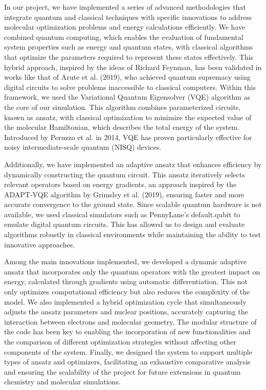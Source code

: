 In our project, we have implemented a series of advanced methodologies that integrate quantum and classical techniques with specific innovations to address molecular optimization problems and energy calculations efficiently. We have combined quantum computing, which enables the evaluation of fundamental system properties such as energy and quantum states, with classical algorithms that optimize the parameters required to represent these states effectively. This hybrid approach, inspired by the ideas of Richard Feynman, has been validated in works like that of Arute et al. (2019), who achieved quantum supremacy using digital circuits to solve problems inaccessible to classical computers. Within this framework, we used the Variational Quantum Eigensolver (VQE) algorithm as the core of our simulation. This algorithm combines parameterized circuits, known as ansatz, with classical optimization to minimize the expected value of the molecular Hamiltonian, which describes the total energy of the system. Introduced by Peruzzo et al. in 2014, VQE has proven particularly effective for noisy intermediate-scale quantum (NISQ) devices.

Additionally, we have implemented an adaptive ansatz that enhances efficiency by dynamically constructing the quantum circuit. This ansatz iteratively selects relevant operators based on energy gradients, an approach inspired by the ADAPT-VQE algorithm by Grimsley et al. (2019), ensuring faster and more accurate convergence to the ground state. Since scalable quantum hardware is not available, we used classical simulators such as PennyLane's default.qubit to emulate digital quantum circuits. This has allowed us to design and evaluate algorithms robustly in classical environments while maintaining the ability to test innovative approaches.

Among the main innovations implemented, we developed a dynamic adaptive ansatz that incorporates only the quantum operators with the greatest impact on energy, calculated through gradients using automatic differentiation. This not only optimizes computational efficiency but also reduces the complexity of the model. We also implemented a hybrid optimization cycle that simultaneously adjusts the ansatz parameters and nuclear positions, accurately capturing the interaction between electrons and molecular geometry. The modular structure of the code has been key to enabling the incorporation of new functionalities and the comparison of different optimization strategies without affecting other components of the system. Finally, we designed the system to support multiple types of ansatz and optimizers, facilitating an exhaustive comparative analysis and ensuring the scalability of the project for future extensions in quantum chemistry and molecular simulations.

